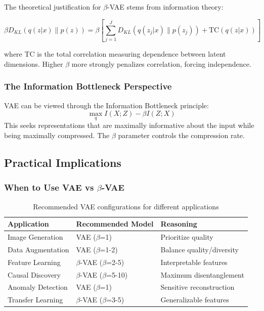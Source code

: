 \documentclass[conference]{IEEEtran}
\begin{document}
The theoretical justification for $\beta$-VAE stems from information theory:

\begin{equation}
\beta D_{KL}(q(z|x) \| p(z)) = \beta \left[ \sum_{j=1}^{J} D_{KL}(q(z_j|x) \| p(z_j)) + \text{TC}(q(z|x)) \right]
\end{equation}

where TC is the total correlation measuring dependence between latent dimensions. Higher $\beta$ more strongly penalizes correlation, forcing independence.

\subsubsection{The Information Bottleneck Perspective}

VAE can be viewed through the Information Bottleneck principle:
\begin{equation}
\max_{q} I(X; Z) - \beta I(Z; X)
\end{equation}
This seeks representations that are maximally informative about the input while being maximally compressed. The $\beta$ parameter controls the compression rate.

\subsection{Practical Implications}

\subsubsection{When to Use VAE vs $\beta$-VAE}

\begin{table}[H]
\centering
\begin{tabular}{@{}p{4cm}p{5cm}p{4cm}@{}}
\toprule
\textbf{Application} & \textbf{Recommended Model} & \textbf{Reasoning} \\ \midrule
Image Generation & VAE ($\beta$=1) & Prioritize quality \\
Data Augmentation & VAE ($\beta$=1-2) & Balance quality/diversity \\
Feature Learning & $\beta$-VAE ($\beta$=2-5) & Interpretable features \\
Causal Discovery & $\beta$-VAE ($\beta$=5-10) & Maximum disentanglement \\
Anomaly Detection & VAE ($\beta$=1) & Sensitive reconstruction \\
Transfer Learning & $\beta$-VAE ($\beta$=3-5) & Generalizable features \\ \bottomrule
\end{tabular}
\caption{Recommended VAE configurations for different applications}
\label{tab:applications}
\end{table}
\end{document}
